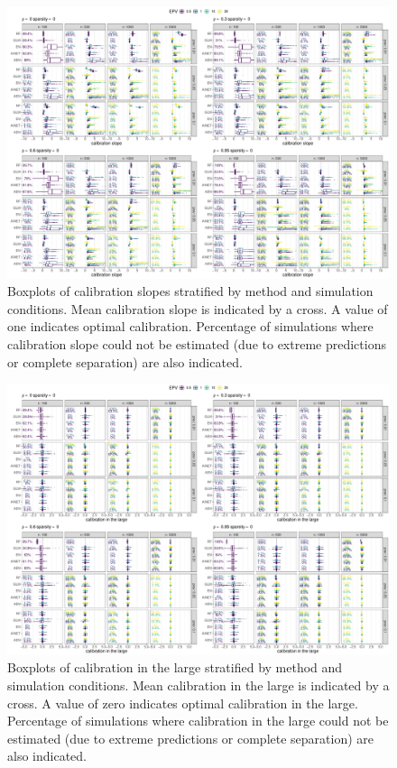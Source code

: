 \documentclass[a4paper, 11pt]{article}
\begin{document}
\begin{landscape}
\begin{figure}[!ht]
\center
\includegraphics[width=0.8\linewidth]{figures-appendix/calibration-cslope_sparsity0.pdf}
\caption{Boxplots of calibration slopes stratified by method and simulation
  conditions. Mean calibration slope is indicated by a cross. A value of one
  indicates optimal calibration. Percentage of simulations where calibration
  slope could not be estimated (due to extreme predictions or complete
  separation) are also indicated.} \label{fig:cslope}
\end{figure}
\end{landscape}

\begin{landscape}
\begin{figure}[!ht]
\center
\includegraphics[width=0.8\linewidth]{figures-appendix/calibration-clarge_sparsity0.pdf}
\caption{Boxplots of calibration in the large stratified by method and
  simulation conditions. Mean calibration in the large is indicated by a cross.
  A value of zero indicates optimal calibration in the large. Percentage of
  simulations where calibration in the large could not be estimated (due to
  extreme predictions or complete separation) are also
  indicated.} \label{fig:clarge}
\end{figure}
\end{landscape}
\end{document}
